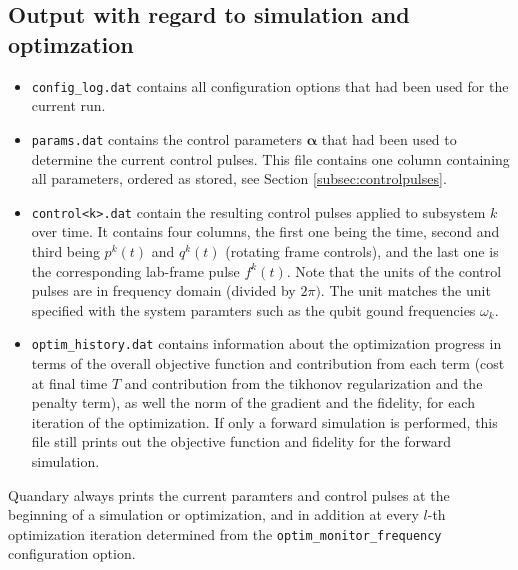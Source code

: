 \documentclass[11pt]{article}
\newcommand{\bfa}{\boldsymbol{\alpha}}
\begin{document}
\subsection{Output with regard to simulation and optimzation}
\begin{itemize}
  \item \texttt{config\_log.dat} contains all configuration options that had been used for the current run. 
  \item \texttt{params.dat} contains the control parameters $\bfa$ that had been used to determine the current control pulses. This file contains one column containing all parameters, ordered as stored, see Section \ref{subsec:controlpulses}.
  \item \texttt{control<k>.dat} contain the resulting control pulses applied to subsystem $k$ over time. It contains four columns, the first one being the time, second and third being $p^k(t)$ and $q^k(t)$ (rotating frame controls), and the last one is the corresponding lab-frame pulse $f^k(t)$. Note that the units of the control pulses are in frequency domain (divided by $2\pi)$. The unit matches the unit specified with the system paramters such as the qubit gound frequencies $\omega_k$.
  \item \texttt{optim\_history.dat} contains information about the optimization progress in terms of the overall objective function and contribution from each term (cost at final time $T$ and contribution from the tikhonov regularization and the penalty term), as well the norm of the gradient and the fidelity, for each iteration of the optimization. If only a forward simulation is performed, this file still prints out the objective function and fidelity for the forward simulation. 
\end{itemize}
Quandary always prints the current paramters and control pulses at the beginning of a simulation or optimization, and in addition at every $l$-th optimization iteration determined from the \texttt{optim\_monitor\_frequency} configuration option. 
\end{document}
